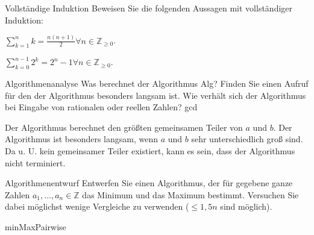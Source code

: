 \documentclass{article}
\begin{document}
\begin{eexercises}{Vollständige Induktion}{
    Beweisen Sie die folgenden Aussagen mit vollständiger Induktion:
  }
  \item $\sum_{k=1}^{n}{k} = \frac{n(n+1)}{2}\forall n \in \mathbb{Z}_{\ge 0}$.
  \item $\sum_{k=0}^{n-1} 2^k = 2^n-1\forall n \in \mathbb{Z}_{\ge 0}$.
\end{eexercises}

\begin{solutions}
  \item {}
  \item {}
\end{solutions}

\begin{exercise}{Algorithmenanalyse}
  Was berechnet der Algorithmus Alg? Finden Sie einen Aufruf für den der Algorithmus besonders langsam ist. Wie verhält sich der Algorithmus bei Eingabe von rationalen oder reellen Zahlen?
  {gcd}

  \begin{solution}
    Der Algorithmus berechnet den größten gemeinsamen Teiler von $a$ und $b$. Der Algorithmus ist besonders langsam, wenn $a$ und $b$ sehr unterschiedlich groß sind. Da u. U. kein gemeinsamer Teiler existiert, kann es sein, dass der Algorithmus nicht terminiert.
  \end{solution}
\end{exercise}

\begin{exercise}{Algorithmenentwurf}
  Entwerfen Sie einen Algorithmus, der für gegebene ganze Zahlen $a_1, \ldots, a_n \in \mathbb{Z}$ das Minimum und das Maximum bestimmt. Versuchen Sie dabei möglichst wenige Vergleiche zu verwenden ($\leq 1,5n$ sind möglich).

  \begin{solution}
    {minMaxPairwise}
  \end{solution}
\end{exercise}
\end{document}
